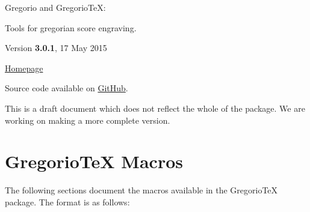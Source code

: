 \documentclass[12pt,a4paper]{article}
\begin{document}
\begin{titlepage}
  \begin{center}
    \Huge
    \textcolor{myred}{Gregorio} and \textcolor{myred}{Gregorio\TeX}:

    Tools for gregorian score engraving.

    \vspace{1cm}

    \large Version \textbf{3.0.1}, 17 May 2015 %

    \vspace{1.5cm}
    \begingroup%
      \redlines
      \def\grelowchoralsignstyle#1{{\cminfamily\small\kern-0.2em#1}}
      \def\grehighchoralsignstyle#1{{\cminfamily\small\kern-0.2em#1}}
      \def\grestar{\greheightstar}
      \color{black!60}
      \setmainfont[SmallCapsFont=AlegreyaSC]{Alegreya}%
      \addtolength{\hsize}{-4cm}%
      \setlength{\fboxsep}{5mm}%
      \begin{list}{}{%
        \setlength{\topsep}{0pt}%
        \setlength{\leftmargin}{1.5cm}%
        \setlength{\rightmargin}{1.5cm}%
        \setlength{\listparindent}{0pt}%
        \setlength{\itemindent}{0pt}%
        \setlength{\parsep}{0pt}%
      }\item[]{}%
      \end{list}%
      \gresetfirstannotation{}
      \gresetsecondannotation{}
    \endgroup%

    \vspace{1.5cm}%
    \href{http://gregorio-project.github.io/}{Homepage}

    Source code available on
    \href{http://github.com/gregorio-project/gregorio}{GitHub}.
  \end{center}

  \vspace{2cm}
  This is a draft document which does not reflect the whole of the package.
  We are working on making a more complete version.
\end{titlepage}

\cleardoublepage

\tableofcontents

\cleardoublepage

\section{Gregorio\TeX{} Macros}
The following sections document the macros available in the Gregorio\TeX{} package. The format is as follows:
\end{document}
